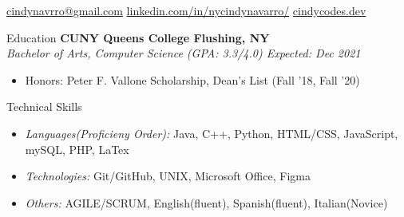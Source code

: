 \documentclass{resume}
\begin{document}
\begin{center}
     \href{mailto:cindynavrro@gmail.com}{cindynavrro@gmail.com} 
     \href{https://www.linkedin.com/in/nycindynavarro/}{linkedin.com/in/nycindynavarro/}
     \href{https://cindycodes.dev}{cindycodes.dev}
\end{center}

\begin{rSection}{Education}
{\bf CUNY Queens College \hfill Flushing, NY} \\
{\it Bachelor of Arts, Computer Science (GPA: 3.3/4.0) \hfill Expected: Dec 2021}
\begin{itemize}
    \item Honors: Peter F. Vallone Scholarship, Dean's List (Fall '18, Fall '20)
\end{itemize}
\end{rSection}
\begin{rSection}{Technical Skills}
    \begin{itemize}
    \itemsep-0.5em 
        \item {\it Languages(Proficieny Order):} Java, C++, Python, HTML/CSS, JavaScript, mySQL, PHP, LaTex
        \item {\it Technologies:} Git/GitHub, UNIX, Microsoft Office, Figma
        \item{\it Others:} AGILE/SCRUM, English(fluent), Spanish(fluent), Italian(Novice)
    \end{itemize}
\end{rSection}
\end{document}

